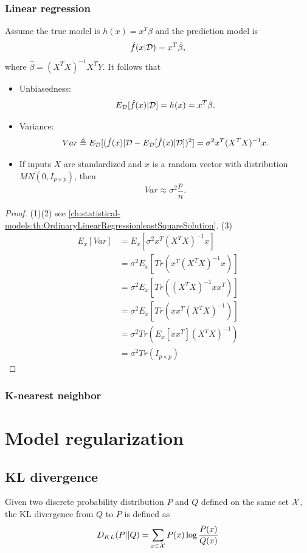 \begin{refsection}
\subsubsection{Linear regression}
\begin{lemma}
Assume the true model is $h(x) = x^T\beta$ and the prediction model is $$\hat{f}(x|\mathcal{D}) = x^T\hat{\beta},$$
where $\hat{\beta} = (X^TX)^{-1}X^TY$.
It follows that
\begin{itemize}
	\item Unbiasedness:
	$$E_{\mathcal{D}}[\hat{f}(x)|\mathcal{D}] = h(x) = x^T\beta.$$
	\item Variance:
	$$Var\triangleq E_{\mathcal{D}}[(\hat{f}(x)|\mathcal{D} - E_{\mathcal{D}}[\hat{f}(x)|\mathcal{D}])^2] = \sigma^2 x^T(X^TX)^{-1}x.$$
	\item If inputs $X$ are standardized and $x$ is a random vector with distribution $MN(0,I_{p\times p})$, then
	$$Var\approx \sigma^2 \frac{p}{n}.$$
\end{itemize}	
\end{lemma}
\begin{proof}
(1)(2) see \autoref{ch:statistical-models:th:OrdinaryLinearRegressionleastSquareSolution}.
(3)
\begin{align*}
E_{x}[Var] &=  E_{x}[\sigma^2 x^T(X^TX)^{-1}x] \\
&=  \sigma^2E_{x}[Tr( x^T(X^TX)^{-1}x)] \\
&=  \sigma^2E_{x}[Tr( (X^TX)^{-1}xx^T)] \\
&=  \sigma^2 E_{x}[Tr( xx^T(X^TX)^{-1})] \\
&=  \sigma^2 Tr(E_{x}[xx^T] (X^TX)^{-1})\\
&=  \sigma^2 Tr(I_{p\times p} )
\end{align*}
\end{proof}


\subsubsection{K-nearest neighbor}


\section{Model regularization}
\subsection{KL divergence}

\begin{definition}
	Given two discrete probability distribution $P$ and $Q$ defined on the same set $\mathcal{X}$, the KL divergence from $Q$ to $P$ is defined as
	$$D_{KL}(P||Q) = \sum_{x\in\mathcal{X}} P(x)\log \frac{P(x)}{Q(x)}$$ 
\end{definition}


\end{refsection}
